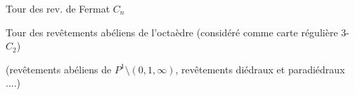 Tour des rev. de Fermat $C_n$

Tour des revêtements abéliens de l'octaèdre
(considéré comme carte régulière 3- $C_2$)


(revêtements abéliens de
$P^1\setminus(0,1,\infty)$, revêtements
diédraux et paradiédraux
....)
